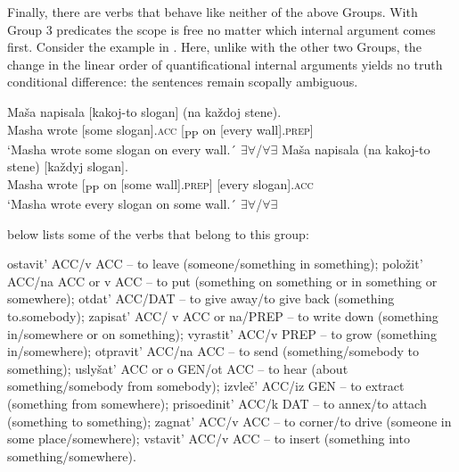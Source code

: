 \documentclass[output=paper,colorlinks,citecolor=brown,nonflat]{./langscibook}
\begin{document}
Finally, there are verbs that behave like neither of the above Groups. With Group 3 predicates the scope is free no matter which internal argument comes first. Consider the example in . Here, unlike with the other two Groups, the change in the linear order of quantificational internal arguments yields no truth conditional difference: the sentences remain scopally ambiguous.


\ea%
    \label{ex:antonyuk:17}
    \ea \label{ex:antonyuk:17a}
    \gll Maša   napisala [kakoj-to slogan] {} (na  každoj stene).\\
    Masha wrote     [some      slogan].\textsc{acc} [\textsubscript{PP} on [every  wall].\textsc{prep}]\\
    \glt `Masha wrote some slogan on every wall.´ \hfill ${\exists}{\forall}$/${\forall}{\exists}$
    \ex \label{ex:antonyuk:17b}
    \gll Maša   napisala {} (na kakoj-to stene)         [každyj slogan].\\
    Masha wrote [\textsubscript{PP} on [some     wall].\textsc{prep}] [every   slogan].\textsc{acc}\\
    \glt `Masha wrote every slogan on some wall.´ \hfill ${\exists}{\forall}$/${\forall}{\exists}$
    \z
\z

 below lists some of the verbs that belong to this group:

\ea%
    \label{ex:antonyuk:18}
    \ea \label{ex:antonyuk:18a}
    ostavit’ ACC/v ACC – to leave (someone/something in something);
    \ex \label{ex:antonyuk:18b}
    položit’ ACC/na ACC or v ACC – to put (something on something or in something or somewhere);
    \ex \label{ex:antonyuk:18c}
    otdat’ ACC/DAT – to give away/to give back (something to.somebody);
    \ex \label{ex:antonyuk:18d}
    zapisat’ ACC/ v ACC or na/PREP – to write down (something in/somewhere or on something);
    \ex \label{ex:antonyuk:18e}
    vyrastit’ ACC/v PREP – to grow (something in/somewhere);
    \ex \label{ex:antonyuk:18f}
    otpravit’ ACC/na ACC – to send (something/somebody to something);
    \ex \label{ex:antonyuk:18g}
    uslyšat’ ACC or o GEN/ot ACC – to hear (about something/somebody from somebody);
    \ex \label{ex:antonyuk:18h}
    izvleč’ ACC/iz GEN – to extract (something from somewhere);
    \ex \label{ex:antonyuk:18i}
    prisoedinit’ ACC/k DAT – to annex/to attach (something to something);
    \ex \label{ex:antonyuk:18j}
    zagnat’ ACC/v ACC – to corner/to drive (someone in some place/somewhere);
    \ex \label{ex:antonyuk:18k}
    vstavit’ ACC/v ACC – to insert (something into something/somewhere).
    \z
\z
\end{document}
